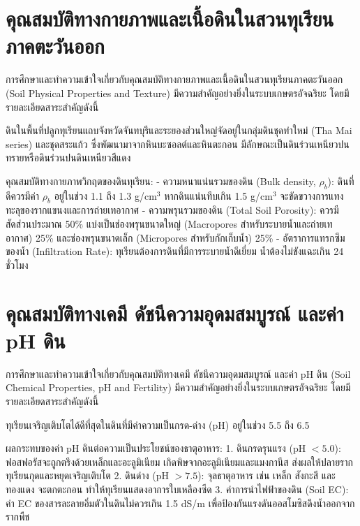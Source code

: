 
\section{คุณสมบัติทางกายภาพและเนื้อดินในสวนทุเรียนภาคตะวันออก}

การศึกษาและทำความเข้าใจเกี่ยวกับคุณสมบัติทางกายภาพและเนื้อดินในสวนทุเรียนภาคตะวันออก (Soil Physical Properties and Texture) มีความสำคัญอย่างยิ่งในระบบเกษตรอัจฉริยะ โดยมีรายละเอียดสาระสำคัญดังนี้

ดินในพื้นที่ปลูกทุเรียนแถบจังหวัดจันทบุรีและระยองส่วนใหญ่จัดอยู่ในกลุ่มดินชุดท่าใหม่ (Tha Mai series) และชุดสระแก้ว ซึ่งพัฒนามาจากหินบะซอลต์และหินตะกอน มีลักษณะเป็นดินร่วนเหนียวปนทรายหรือดินร่วนปนดินเหนียวสีแดง

คุณสมบัติทางกายภาพวิกฤตของดินทุเรียน:
- ความหนาแน่นรวมของดิน (Bulk density, $\rho_b$): ดินที่ดีควรมีค่า $\rho_b$ อยู่ในช่วง 1.1 ถึง 1.3 g/cm$^3$ หากดินแน่นทึบเกิน 1.5 g/cm$^3$ จะขัดขวางการแทงทะลุของรากแขนงและการถ่ายเทอากาศ
- ความพรุนรวมของดิน (Total Soil Porosity): ควรมีสัดส่วนประมาณ 50\% แบ่งเป็นช่องพรุนขนาดใหญ่ (Macropores สำหรับระบายน้ำและถ่ายเทอากาศ) 25\% และช่องพรุนขนาดเล็ก (Micropores สำหรับกักเก็บน้ำ) 25\%
- อัตราการแทรกซึมของน้ำ (Infiltration Rate): ทุเรียนต้องการดินที่มีการระบายน้ำดีเยี่ยม น้ำต้องไม่ขังแฉะเกิน 24 ชั่วโมง

\section{คุณสมบัติทางเคมี ดัชนีความอุดมสมบูรณ์ และค่า pH ดิน}

การศึกษาและทำความเข้าใจเกี่ยวกับคุณสมบัติทางเคมี ดัชนีความอุดมสมบูรณ์ และค่า pH ดิน (Soil Chemical Properties, pH and Fertility) มีความสำคัญอย่างยิ่งในระบบเกษตรอัจฉริยะ โดยมีรายละเอียดสาระสำคัญดังนี้

ทุเรียนเจริญเติบโตได้ดีที่สุดในดินที่มีค่าความเป็นกรด-ด่าง (pH) อยู่ในช่วง 5.5 ถึง 6.5

ผลกระทบของค่า pH ดินต่อความเป็นประโยชน์ของธาตุอาหาร:
1. ดินกรดรุนแรง (pH $< 5.0$): ฟอสฟอรัสจะถูกตรึงด้วยเหล็กและอะลูมิเนียม เกิดพิษจากอะลูมิเนียมและแมงกานีส ส่งผลให้ปลายรากทุเรียนกุดและหยุดเจริญเติบโต
2. ดินด่าง (pH $> 7.5$): จุลธาตุอาหาร เช่น เหล็ก สังกะสี และทองแดง จะตกตะกอน ทำให้ทุเรียนแสดงอาการใบเหลืองซีด
3. ค่าการนำไฟฟ้าของดิน (Soil EC): ค่า EC ของสารละลายอิ่มตัวในดินไม่ควรเกิน 1.5 dS/m เพื่อป้องกันแรงดันออสโมซิสดึงน้ำออกจากรากพืช

